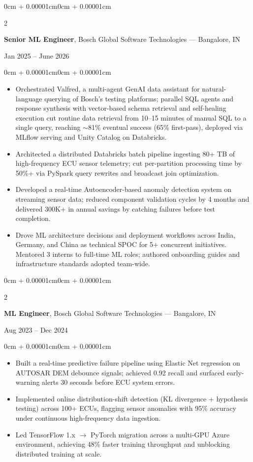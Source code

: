 \documentclass[10pt, letterpaper]{article}
\newcommand{\EURfix}{{\fontfamily{lmr}\selectfont\texteuro}}
\newenvironment{highlights}{
    \begin{itemize}[
        topsep=0.08cm, parsep=0.08cm,
        partopsep=0pt, itemsep=0pt,
        leftmargin=0cm + 10pt
    ]
}{\end{itemize}}
\newenvironment{onecolentry}{
    \begin{adjustwidth}{0cm + 0.00001cm}{0cm + 0.00001cm}
}{\end{adjustwidth}}
\newenvironment{twocolentry}[2][]{
    \onecolentry
    \def\secondColumn{#2}
    \setcolumnwidth{\fill, 4.5cm}
    \begin{paracol}{2}
}{
    \switchcolumn \raggedleft \secondColumn
    \end{paracol}
    \endonecolentry
}
\begin{document}
\begin{twocolentry}{Jan 2025 -- June 2026}
    \textbf{Senior ML Engineer}, Bosch Global Software Technologies --- Bangalore, IN
\end{twocolentry}

\vspace{0.08cm}
\begin{onecolentry}
    \begin{highlights}
        \item Orchestrated Valfred, a multi-agent GenAI data assistant for natural-language querying of Bosch's testing platforms; parallel SQL agents and response synthesis with vector-based schema retrieval and self-healing execution cut routine data retrieval from 10--15 minutes of manual SQL to a single query, reaching $\sim$81\% eventual success (65\% first-pass), deployed via MLflow serving and Unity Catalog on Databricks.
        \item Architected a distributed Databricks batch pipeline ingesting 80+ TB of high-frequency ECU sensor telemetry; cut per-partition processing time by 50\%+ via PySpark query rewrites and broadcast join optimization.
        \item Developed a real-time Autoencoder-based anomaly detection system on streaming sensor data; reduced component validation cycles by 4 months and delivered \EURfix300K+ in annual savings by catching failures before test completion.
        \item Drove ML architecture decisions and deployment workflows across India, Germany, and China as technical SPOC for 5+ concurrent initiatives. Mentored 3 interns to full-time ML roles; authored onboarding guides and infrastructure standards adopted team-wide.
    \end{highlights}
\end{onecolentry}

\vspace{0.15cm}

\begin{twocolentry}{Aug 2023 -- Dec 2024}
    \textbf{ML Engineer}, Bosch Global Software Technologies --- Bangalore, IN
\end{twocolentry}

\vspace{0.08cm}
\begin{onecolentry}
    \begin{highlights}
        \item Built a real-time predictive failure pipeline using Elastic Net regression on AUTOSAR DEM debounce signals; achieved 0.92 recall and surfaced early-warning alerts 30 seconds before ECU system errors.
        \item Implemented online distribution-shift detection (KL divergence + hypothesis testing) across 100+ ECUs, flagging sensor anomalies with 95\% accuracy under continuous high-frequency data ingestion.
        \item Led TensorFlow 1.x $\rightarrow$ PyTorch migration across a multi-GPU Azure environment, achieving 48\% faster training throughput and unblocking distributed training at scale.
    \end{highlights}
\end{onecolentry}
\end{document}
